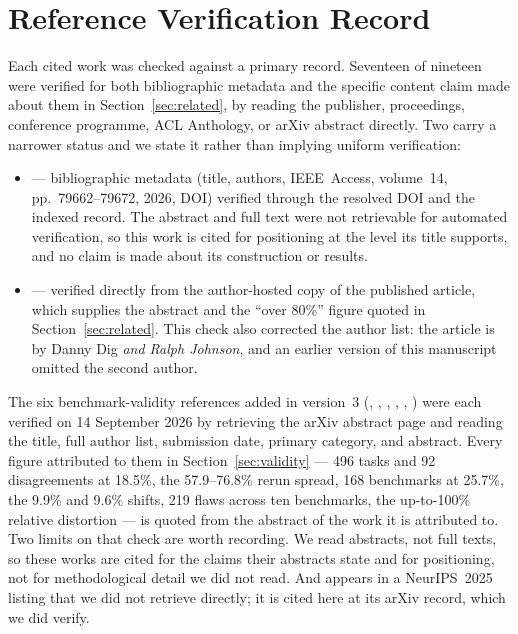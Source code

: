 \documentclass[11pt]{article}
\begin{document}
\section{Reference Verification Record}
\label{app:refs}

Each cited work was checked against a primary record. Seventeen of nineteen were
verified for both bibliographic metadata and the specific content claim made
about them in Section~\ref{sec:related}, by reading the publisher, proceedings,
conference programme, ACL Anthology, or arXiv abstract directly. Two carry a
narrower status and we state it rather than implying uniform verification:

\begin{itemize}
  \item \cite{assidiqi2026referencefree} --- bibliographic metadata (title,
  authors, IEEE~Access, volume~14, pp.~79662--79672, 2026, DOI) verified
  through the resolved DOI and the indexed record. The abstract and full text
  were not retrievable for automated verification, so this work is cited for
  positioning at the level its title supports, and no claim is made about its
  construction or results.
  \item \cite{dig2006api} --- verified directly from the author-hosted copy of
  the published article, which supplies the abstract and the ``over 80\%''
  figure quoted in Section~\ref{sec:related}. This check also corrected the
  author list: the article is by Danny Dig \emph{and Ralph Johnson}, and an
  earlier version of this manuscript omitted the second author.
\end{itemize}

The six benchmark-validity references added in version~3
(\cite{bhat2026benchmarking}, \cite{mohl2026transcript},
\cite{wang2026autoaudit}, \cite{wang2026benchjack}, \cite{zhu2025abc},
\cite{zhang2026doubleconfound}) were each verified on 14 September 2026 by
retrieving the arXiv abstract page and reading the title, full author list,
submission date, primary category, and abstract. Every figure attributed to
them in Section~\ref{sec:validity} --- 496 tasks and 92 disagreements at
18.5\%, the 57.9--76.8\% rerun spread, 168 benchmarks at 25.7\%, the 9.9\% and
9.6\% shifts, 219 flaws across ten benchmarks, the up-to-100\% relative
distortion --- is quoted from the abstract of the work it is attributed to.
Two limits on that check are worth recording. We read abstracts, not full
texts, so these works are cited for the claims their abstracts state and for
positioning, not for methodological detail we did not read. And
\cite{zhu2025abc} appears in a NeurIPS~2025 listing that we did not retrieve
directly; it is cited here at its arXiv record, which we did verify.
\end{document}
